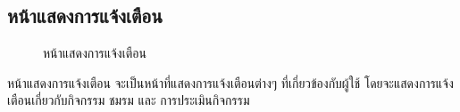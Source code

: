 \documentclass[14pt,oneside,openright,a4paper]{cpe-thai-project}
\begin{document}
\subsection{หน้าแสดงการแจ้งเตือน}
\begin{figure}[!h]\centering
  \setlength{\fboxrule}{0.5mm} %
  \setlength{\fboxsep}{0.5cm}
  \caption{หน้าแสดงการแจ้งเตือน}\label{fig:ui3}
\end{figure}
\hspace*{1cm} หน้าแสดงการแจ้งเตือน จะเป็นหน้าที่แสดงการแจ้งเตือนต่างๆ ที่เกี่ยวข้องกับผู้ใช้ โดยจะแสดงการแจ้งเตือนเกี่ยวกับกิจกรรม ชมรม และ การประเมินกิจกรรม

\newpage
\end{document}
